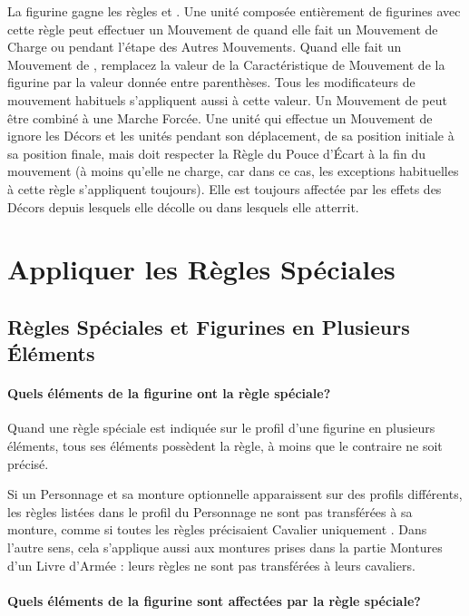 
La figurine gagne les règles \swiftstride{} et \lighttroops{}. Une unité composée entièrement de figurines avec cette règle peut effectuer un Mouvement de \fly{} quand elle fait un Mouvement de Charge ou pendant l'étape des Autres Mouvements. Quand elle fait un Mouvement de \fly{}, remplacez la valeur de la Caractéristique de Mouvement de la figurine par la valeur donnée entre parenthèses. Tous les modificateurs de mouvement habituels s'appliquent aussi à cette valeur. Un Mouvement de \fly{} peut être combiné à une Marche Forcée. Une unité qui effectue un Mouvement de \fly{} ignore les Décors et les unités pendant son déplacement, de sa position initiale à sa position finale, mais doit respecter la Règle du Pouce d'Écart à la fin du mouvement (à moins qu'elle ne charge, car dans ce cas, les exceptions habituelles à cette règle s'appliquent toujours). Elle est toujours affectée par les effets des Décors depuis lesquels elle décolle ou dans lesquels elle atterrit.

\newpage
\section{Appliquer les Règles Spéciales}
\label{applying_special_rules}

\subsection{Règles Spéciales et Figurines en Plusieurs Éléments}

\paragraph{Quels éléments de la figurine ont la règle spéciale?}

Quand une règle spéciale est indiquée sur le profil d'une figurine en plusieurs éléments, tous ses éléments possèdent la règle, à moins que le contraire ne soit précisé.

Si un Personnage et sa monture optionnelle apparaissent sur des profils différents, les règles listées dans le profil du Personnage ne sont pas transférées à sa monture, comme si toutes les règles précisaient \og Cavalier uniquement \fg{}. Dans l'autre sens, cela s'applique aussi aux montures prises dans la partie Montures d'un Livre d'Armée : leurs règles ne sont pas transférées à leurs cavaliers.

\paragraph{Quels éléments de la figurine sont affectées par la règle spéciale?}

